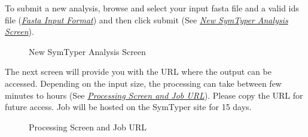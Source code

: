 \documentclass[letterpaper,10pt,english]{sphinxmanual}
\begin{document}
To submit a new analysis, browse and select your input fasta file and a valid  ids file ({\hyperref[defs:inputformat]{\emph{Fasta Input Format}}}) and then click submit (See {\hyperref[Web:fig2]{\emph{New SymTyper Analysis Screen}}}).
\begin{figure}[htbp]
\centering
\capstart

\caption{New SymTyper Analysis Screen}\label{Web:fig2}\end{figure}

The next screen will provide you with the URL where the output can be accessed.
Depending on the input size, the processing can take between few minutes to hours (See {\hyperref[Web:fig3]{\emph{Processing Screen and Job URL}}}).
Please copy the URL for future access. Job will be hosted on the SymTyper site for 15 days.
\begin{figure}[htbp]
\centering
\capstart

\caption{Processing Screen and Job URL}\label{Web:fig3}\end{figure}
\end{document}
